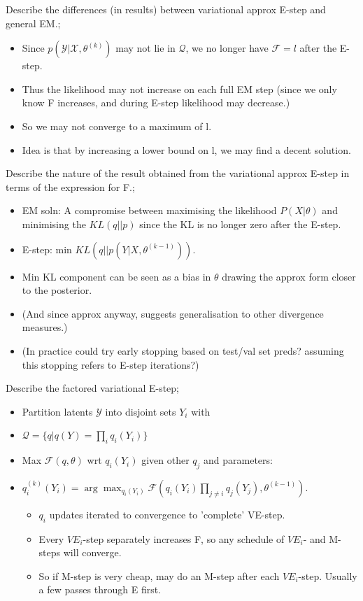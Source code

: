 \documentclass{article}
\begin{document}
Describe the differences (in results) between variational approx E-step and general EM.; \begin{itemize} \item Since $p(\mathcal{Y}|\mathcal{X},\theta^{(k)})$ may not lie in $\mathcal{Q}$, we no longer have $\mathcal{F}=l$ after the E-step.  \item Thus the likelihood may not increase on each full EM step (since we only know F increases, and during E-step likelihood may decrease.) \item So we may not converge to a maximum of l.  \item Idea is that by increasing a lower bound on l, we may find a decent solution.  \end{itemize}

Describe the nature of the result obtained from the variational approx E-step in terms of the expression for F.; \begin{itemize} \item EM soln: A compromise between maximising the likelihood $P(X|\theta)$ and minimising the $KL(q||p)$ since the KL is no longer zero after the E-step.  \item E-step: min $KL(q||p(Y|X,\theta^{(k-1)}))$.  \item Min KL component can be seen as a bias in $\theta$ drawing the approx form closer to the posterior.  \item (And since approx anyway, suggests generalisation to other divergence measures.) \item (In practice could try early stopping based on test/val set preds? assuming this stopping refers to E-step iterations?) \end{itemize}

Describe the factored variational E-step; \begin{itemize} \item Partition latents $\mathcal{Y}$ into disjoint sets $Y_i$ with \item $\mathcal{Q}=\{q|q(Y)=\prod_i q_i(Y_i)\}$ \item Max $\mathcal{F}(q,\theta)$ wrt $q_i(Y_i)$ given other $q_j$ and parameters: \item $q_i^{(k)}(Y_i)=\arg\max_{q_i(Y_i)}\mathcal{F}(q_i(Y_i)\prod_{j\ne i}q_j(Y_j),\theta^{(k-1)})$.  \begin{itemize} \item $q_i$ updates iterated to convergence to 'complete' VE-step.  \item Every $VE_i$-step separately increases F, so any schedule of $VE_i$- and M-steps will converge.  \item So if M-step is very cheap, may do an M-step after each $VE_i$-step. Usually a few passes through E first.  \end{itemize} \end{itemize}
\end{document}
